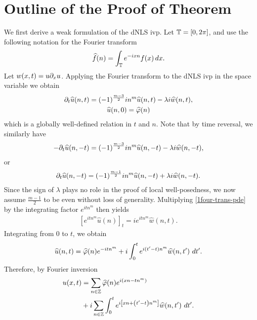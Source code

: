 \section{Outline of the Proof of Theorem}
%
%
%
%
%
We first derive a weak formulation of the dNLS ivp. 
Let $\mathbb{T} = [0, 2 \pi]$, and use
the following notation for the Fourier transform
%
%
%
%
\begin{equation}
	\label{1four-trans-pde}
	\begin{split}
		\widehat{f}(n) = \int_{\mathbb{T}} e^{-ix n} f(x) \, dx.
	\end{split}
\end{equation}
Let $w(x,t) = u \partial_x u$. Applying 
the Fourier transform to the dNLS ivp in the space variable we obtain 
%
%
\begin{gather*}
	\partial_t \widehat{u}(n, t) = (-1)^{\frac{m-3}{2}}i n^m \widehat{u}(n, t) - \lambda i  
	\widehat{w} (n, t),
	\\
	\widehat{u} (n,0) = \widehat{\varphi}(n)
\end{gather*}
%
%
which is a globally well-defined relation in $t$ 
and $n$. Note that by time reversal, we similarly have 
\begin{gather*}
	-\partial_t \widehat{u}(n, -t) = (-1)^{\frac{m-3}{2}}i n^m \widehat{u}(n, -t) - \lambda i  
	\widehat{w} (n, -t),
\end{gather*}
or
\begin{gather*}
	\partial_t \widehat{u}(n, -t) = (-1)^{\frac{m-1}{2}}i n^m \widehat{u}(n, -t) + \lambda i  
	\widehat{w} (n, -t).
\end{gather*}
Since the sign of $\lambda$ plays no role in the proof of local well-posedness,
we now assume $\frac{m-1}{2}$ to be even without loss of generality. 
Multiplying \eqref{1four-trans-pde} by the integrating factor $e^{itn^m}$ then yields
\begin{equation*}
	\begin{split}
		\left[ e^{ it n^m} \widehat{u}(n) \right]_t = i
		 e^{ it n^m} \widehat{w} (n, t).	
	\end{split}
\end{equation*}
%
%
Integrating from $0$ to $t$, we obtain
%
%
\begin{equation*}
	\begin{split}
		\wh{u}(n, t) = \wh{\vp}(n) e^{- it n^m} + i  
		\int_0^t e^{ i(t' - t) n^m} \wh{w}(n, t') \ 
		dt'.
	\end{split}
\end{equation*}
%
%
Therefore, by Fourier inversion 
%
%
\begin{equation}
	\label{1dNLS-integral-form}
	\begin{split}
		u(x,t) & = \sum_{n \in \mathbb{Z}} \widehat{\varphi}(n) e^{i\left( xn - t n^m 
		\right)} 
		\\
		& + i \sum_{n \in \mathbb{Z}} \int_0^t e^{i\left[ xn + \left( t' - t 
		\right) n^m \right]} \widehat{w}(n, t') \ dt'.
	\end{split}
\end{equation}
